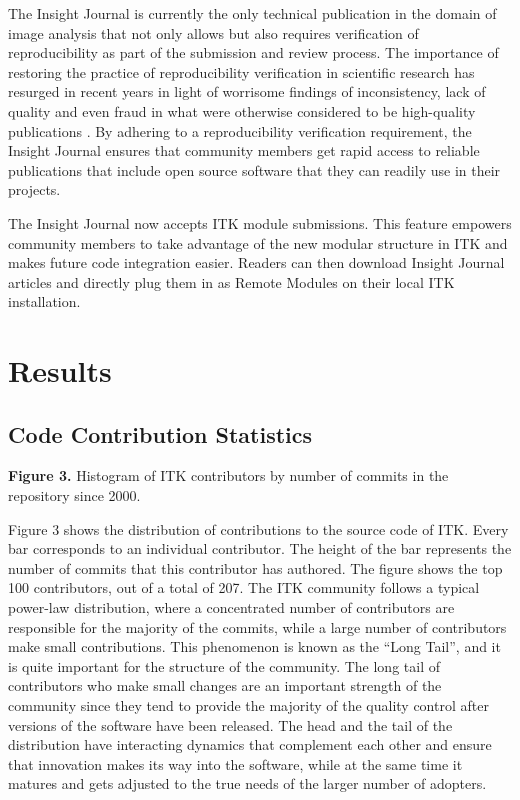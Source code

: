 \documentclass{frontiersENG} %
\begin{document}
The Insight Journal is currently the only technical publication in the domain
of image analysis that not only allows but also requires verification of
reproducibility as part of the submission and review process. The importance of
restoring the practice of reproducibility verification in scientific research
has resurged in recent years in light of worrisome findings of inconsistency,
lack of quality and even fraud in what were otherwise considered to be
high-quality publications \cite{Begley2012}. By adhering to a reproducibility
verification requirement, the Insight Journal ensures that community members
get rapid access to reliable publications that include open source software
that they can readily use in their projects.

The Insight Journal now accepts ITK module submissions. This feature empowers
community members to take advantage of the new modular structure in ITK and
makes future code integration easier. Readers can then download Insight Journal
articles and directly plug them in as Remote Modules on their local ITK
installation.




\section{Results}


\subsection{Code Contribution Statistics}

\textbf{Figure 3. }{Histogram of ITK contributors by number of commits in the repository since 2000.}\label{fig:03}

Figure 3 shows the distribution of contributions to the source code of ITK.
Every bar corresponds to an individual contributor. The height of the bar
represents the number of commits that this contributor has authored.  The
figure shows the top 100 contributors, out of a total of 207. The ITK community
follows a typical power-law distribution, where a concentrated number of
contributors are responsible for the majority of the commits, while a large
number of contributors make small contributions.  This phenomenon is known as
the ``Long Tail'', and it is quite important for the structure of the
community. The long tail of contributors who make small changes are an
important strength of the community since they tend to provide the majority of
the quality control after versions of the software have been released. The head
and the tail of the distribution have interacting dynamics that complement each
other and ensure that innovation makes its way into the software, while at the
same time it matures and gets adjusted to the true needs of the larger number
of adopters.
\end{document}

